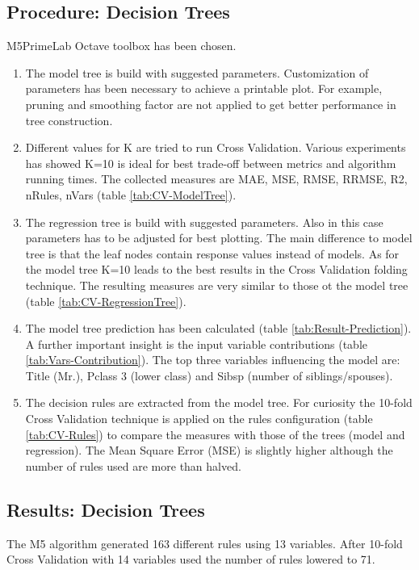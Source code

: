 \documentclass{article}
\begin{document}
\subsection{Procedure: Decision Trees}
M5PrimeLab Octave toolbox has been chosen.
\begin{enumerate}  
	\item The model tree is build with suggested parameters. Customization of parameters has been necessary to achieve a printable plot. For example, pruning and smoothing factor are not applied to get better performance in tree construction.
	\item Different values for K are tried to run Cross Validation. Various experiments has showed K=10 is ideal for best trade-off between metrics and algorithm running times. The collected measures are MAE, MSE, RMSE, RRMSE, R2, nRules, nVars (table \ref{tab:CV-ModelTree}).
	\item The regression tree is build with suggested parameters. Also in this case parameters has to be adjusted for best plotting. The main difference to model tree is that the leaf nodes contain response values instead of models. As for the model tree K=10 leads to the best results in the Cross Validation folding technique. The resulting measures are very similar to those ot the model tree (table \ref{tab:CV-RegressionTree}).
	\item The model tree prediction has been calculated (table \ref{tab:Result-Prediction}). A further important insight is the input variable contributions (table \ref{tab:Vars-Contribution}).  The top three variables influencing the model are: Title (Mr.), Pclass 3 (lower class) and Sibsp (number of siblings/spouses).
	\item The decision rules are extracted from the model tree. For curiosity the 10-fold Cross Validation technique is applied on the rules configuration (table \ref{tab:CV-Rules}) to compare the measures with those of the trees (model and regression). The Mean Square Error (MSE) is slightly higher although the number of rules used are more than halved.
\end{enumerate}

\subsection{Results: Decision Trees}
The M5 algorithm generated 163 different rules using 13 variables.
\break After 10-fold Cross Validation with 14 variables used the number of rules lowered to 71.
\end{document}

